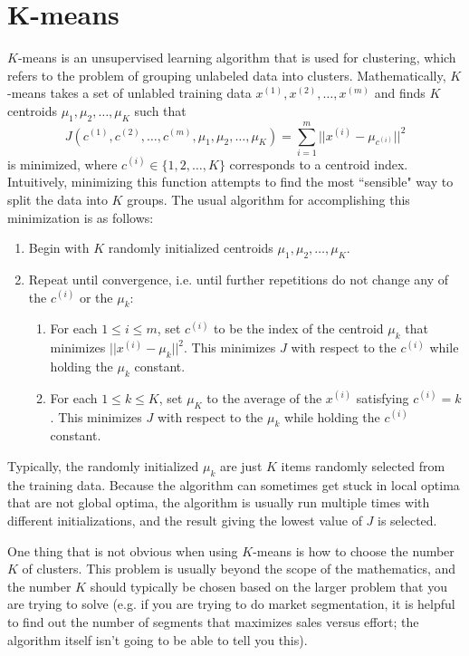\documentclass{article}
\begin{document}
\section{K-means}
$K$-means is an unsupervised learning algorithm that is used for clustering, which refers to the problem of grouping unlabeled data into clusters. Mathematically, $K$-means takes a set of unlabled training data $x^{(1)}, x^{(2)}, \dots, x^{(m)}$ and finds $K$ centroids $\mu_1, \mu_2, \dots, \mu_K$ such that
$$J(c^{(1)}, c^{(2)}, \dots, c^{(m)}, \mu_1, \mu_2, \dots, \mu_K) = \sum_{i=1}^m ||x^{(i)} - \mu_{c^{(i)}}||^2$$
is minimized, where $c^{(i)} \in \{1, 2, \dots, K\}$ corresponds to a centroid index. Intuitively, minimizing this function attempts to find the most ``sensible" way to split the data into $K$ groups. The usual algorithm for accomplishing this minimization is as follows:
\begin{enumerate}
\item Begin with $K$ randomly initialized centroids $\mu_1, \mu_2, \dots, \mu_K$.
\item Repeat until convergence, i.e. until further repetitions do not change any of the $c^{(i)}$ or the $\mu_k$:
\begin{enumerate}
\item For each $1 \le i \le m$, set $c^{(i)}$ to be the index of the centroid $\mu_k$ that minimizes $||x^{(i)} - \mu_k||^2$. This minimizes $J$ with respect to the $c^{(i)}$ while holding the $\mu_k$ constant.
\item For each $1 \le k \le K$, set $\mu_K$ to the average of the $x^{(i)}$ satisfying $c^{(i)} =k$. This minimizes $J$ with respect to the $\mu_k$ while holding the $c^{(i)}$ constant.
\end{enumerate}
\end{enumerate}
Typically, the randomly initialized $\mu_k$ are just $K$ items randomly selected from the training data. Because the algorithm can sometimes get stuck in local optima that are not global optima, the algorithm is usually run multiple times with different initializations, and the result giving the lowest value of $J$ is selected.

One thing that is not obvious when using $K$-means is how to choose the number $K$ of clusters. This problem is usually beyond the scope of the mathematics, and the number $K$ should typically be chosen based on the larger problem that you are trying to solve (e.g. if you are trying to do market segmentation, it is helpful to find out the number of segments that maximizes sales versus effort; the algorithm itself isn't going to be able to tell you this).
\end{document}
